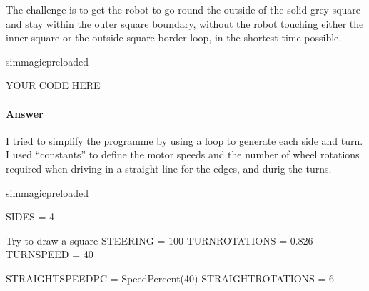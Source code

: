 \documentclass[letterpaper,10pt,english]{sphinxmanual}
\begin{document}
{The challenge is to get the robot to go round the outside of the solid grey square and stay within the outer square boundary, without the robot touching either the inner square or the outside square border loop, in the shortest time possible.


{
\begin{sphinxVerbatim}[commandchars=\\\{\}]
\llap{\color{nbsphinxin}[ ]:\,\hspace{\fboxrule}\hspace{\fboxsep}}\PYGZpc{}\PYGZpc{}sim\PYGZus{}magic\PYGZus{}preloaded

\PYGZsh{} YOUR CODE HERE
\end{sphinxVerbatim}
}


\paragraph{Answer}
\label{\detokenize{content/01_Robot_Lab/Section_00_02:id1}}

I tried to simplify the programme by using a  loop to generate each side and turn. I used “constants” to define the motor speeds and the number of wheel rotations required when driving in a straight line for the edges, and durig the turns.

{
\begin{sphinxVerbatim}[commandchars=\\\{\}]
\llap{\color{nbsphinxin}[ ]:\,\hspace{\fboxrule}\hspace{\fboxsep}}\PYGZpc{}\PYGZpc{}sim\PYGZus{}magic\PYGZus{}preloaded

SIDES = 4

\PYGZsh{} Try to draw a square
STEERING = \PYGZhy{}100
TURN\PYGZus{}ROTATIONS = 0.826
TURN\PYGZus{}SPEED = 40

STRAIGHT\PYGZus{}SPEED\PYGZus{}PC = SpeedPercent(40)
STRAIGHT\PYGZus{}ROTATIONS = 6


\end{sphinxVerbatim}}}
\end{document}
